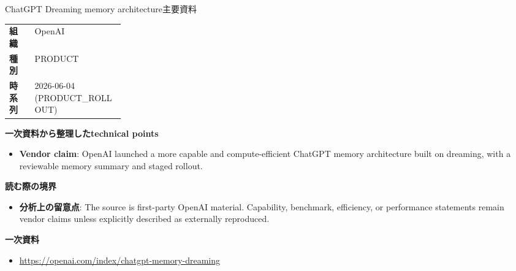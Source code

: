 \begin{technicalnote}{ChatGPT Dreaming memory architecture}{主要資料}
\begin{tabularx}{\linewidth}{@{}>{\bfseries}p{0.22\linewidth}X@{}}
組織 & OpenAI \\
種別 & PRODUCT \\
時系列 & 2026-06-04 (PRODUCT\_ROLLOUT) \\
\end{tabularx}
\smallskip
{\bfseries 一次資料から整理したtechnical points}
\begin{itemize}[leftmargin=1.5em,itemsep=0.35em]
\item \textbf{Vendor claim}: OpenAI launched a more capable and compute-efficient ChatGPT memory architecture built on dreaming, with a reviewable memory summary and staged rollout.
\end{itemize}
{\bfseries 読む際の境界}
\begin{itemize}[leftmargin=1.5em,itemsep=0.35em]
\item \textbf{分析上の留意点}: The source is first-party OpenAI material. Capability, benchmark, efficiency, or performance statements remain vendor claims unless explicitly described as externally reproduced.
\end{itemize}
{\bfseries 一次資料}
\begingroup\sloppy
\begin{itemize}[leftmargin=1.5em,itemsep=0.25em]
\item {\scriptsize\url{https://openai.com/index/chatgpt-memory-dreaming}}
\end{itemize}
\endgroup
\end{technicalnote}
\medskip

